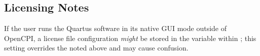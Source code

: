 \begin{flushleft}
\subsection{Licensing Notes}
If the user runs the Quartus software in its native GUI mode outside of OpenCPI, a license file configuration \textit{might} be stored in the variable  within ; this setting overrides the  noted above and may cause confusion.

\end{flushleft}


